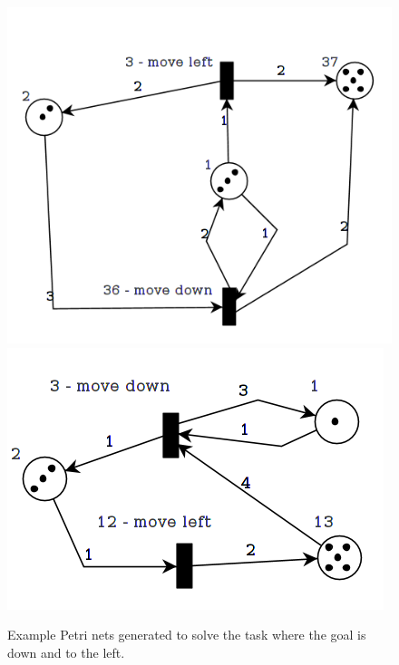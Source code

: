 \documentclass[12pt,a4paper,twocolumn]{article}
\begin{document}
\begin{figure} [h]
\centering
\includegraphics[scale=0.3, trim = 0 5mm 0 20mm, clip = true] {PetriNet_2_1}
\includegraphics[scale=0.3, trim = 0 10mm 0 20mm, clip = true] {PetriNet_2_2}
\caption{Example Petri nets generated to solve the task where the goal is down and to the left.}
\label{fig:pn1_3}
\end{figure}
\end{document}
